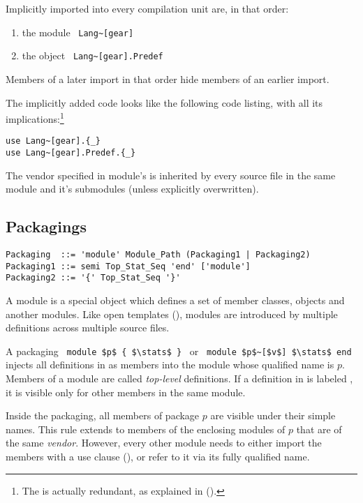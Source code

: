 Implicitly imported into every compilation unit are, in that order: 
\begin{enumerate}
\item the module ~\lstinline!Lang~[gear]! 
\item the object ~\lstinline!Lang~[gear].Predef!
\end{enumerate} 
Members of a later import in that order hide members of an earlier import. 


The implicitly added code looks like the following code listing, with all its implications:\footnote{The  is actually redundant, as explained in ().}
\begin{lstlisting}
use Lang~[gear].{_}
use Lang~[gear].Predef.{_}
\end{lstlisting}

The vendor specified in module's  is inherited by every source file in the same module and it's submodules (unless explicitly overwritten). 





\subsection{Packagings}

\syntax\begin{lstlisting}
Packaging  ::= 'module' Module_Path (Packaging1 | Packaging2)
Packaging1 ::= semi Top_Stat_Seq 'end' ['module']
Packaging2 ::= '{' Top_Stat_Seq '}'
\end{lstlisting}

A module is a special object which defines a set of member classes, objects and another modules. Like open templates (), modules are introduced by multiple definitions across multiple source files.  

A packaging ~\lstinline!module $p$ { $\stats$ }!~ or ~\lstinline!module $p$~[$v$] $\stats$ end!~ injects all definitions in \stats as members into the module whose qualified name is $p$. Members of a module are called {\em top-level} definitions. If a definition in \stats is labeled , it is visible only for other members in the same module. 

Inside the packaging, all members of package $p$ are visible under their simple names. This rule extends to members of the enclosing modules of $p$ that are of the same {\em vendor}. However, every other module needs to either import the members with a use clause (), or refer to it via its fully qualified name. 

